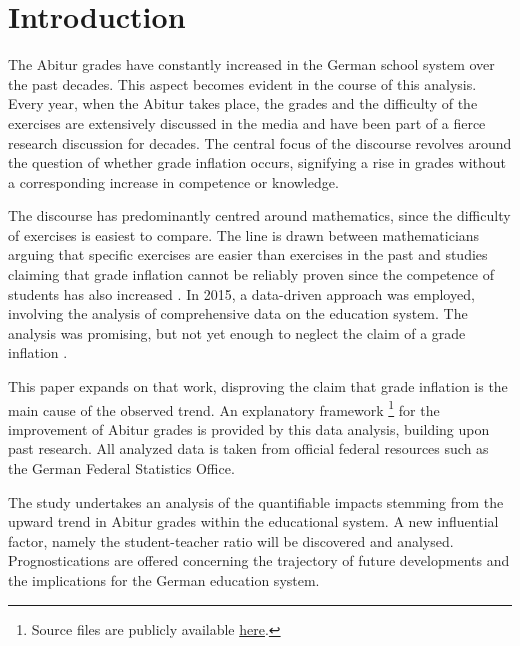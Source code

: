 \section{Introduction} \label{sec:Introduction}
The Abitur grades have constantly increased in the German school system over the past decades. This aspect becomes evident in the course of this analysis. Every year, when the Abitur takes place, the grades and the difficulty of the exercises are extensively discussed in the media and have been part of a fierce research discussion for decades. The central focus of the discourse revolves around the question of whether grade inflation occurs, signifying a rise in grades without a corresponding increase in competence or knowledge.


The discourse has predominantly centred around mathematics, since the difficulty of exercises is easiest to compare. The line is drawn between mathematicians arguing that specific exercises are easier than exercises in the past \cite{kuhnel_modellierungskompetenz_2015, jahnke_hamburger_2014,lemmermeyer_zentralabitur_nodate} and studies claiming that grade inflation cannot be reliably proven since the competence of students has also increased \cite{schleithoff_noteninflation_2015}.
In 2015, a data-driven approach was employed, involving the analysis of comprehensive data on the education system. The analysis was promising, but not yet enough to neglect the claim of a grade inflation \cite{grozinger_gibt_2015}.

This paper expands on that work, disproving the claim that grade inflation is the main cause of the observed trend. An explanatory framework \footnote{Source files are publicly available \href{https://github.com/KarylReyne/DataLiteracyWS23}{here}.} for the improvement of Abitur grades is provided by this data analysis, building upon past research. All analyzed data is taken from official federal resources such as the German Federal Statistics Office.

The study undertakes an analysis of the quantifiable impacts stemming from the upward trend in Abitur grades within the educational system. A new influential factor, namely the student-teacher ratio will be discovered and analysed. Prognostications are offered concerning the trajectory of future developments and the implications for the German education system.
